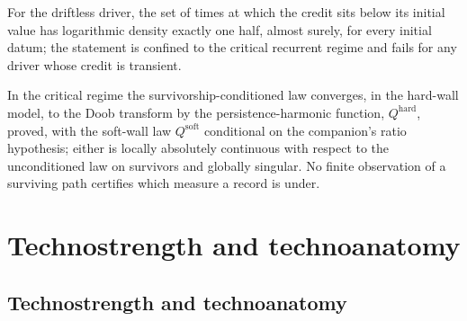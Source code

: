 \begin{theorem}\label{imp:half}
For the driftless driver, the set of times at which the credit sits below
its initial value has logarithmic density exactly one half, almost
surely, for every initial datum; the statement is confined to the
critical recurrent regime and fails for any driver whose credit is
transient.
\end{theorem}

\begin{theorem}\label{imp:ceiling}
In the critical regime the survivorship-conditioned law converges, in the
hard-wall model, to the Doob transform by the persistence-harmonic
function, $Q^{\mathrm{hard}}$, proved, with the soft-wall law
$Q^{\mathrm{soft}}$ conditional on the companion's ratio hypothesis;
either is locally absolutely continuous with respect to the
unconditioned law on survivors and globally singular. No finite observation of a surviving path certifies
which measure a record is under.
\end{theorem}

\section{Technostrength and technoanatomy}\label{sec:coords}

\subsection{Technostrength and technoanatomy}\label{gr:sub:coords}

